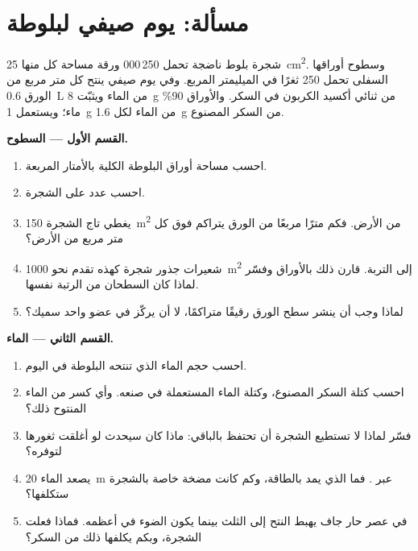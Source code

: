\section{مسألة: يوم صيفي لبلوطة}

\begin{problem}
\label{pb:g12:plant-rooted-life:1}
شجرة بلوط ناضجة تحمل 250\,000 ورقة مساحة كل منها \qty{25}{cm^2}.
وسطوح أوراقها السفلى تحمل 250 ثغرًا في الميليمتر المربع. وفي يوم صيفي
ينتح كل متر مربع من الورق \qty{0.6}{L} من الماء ويثبّت
\qty{8}{g} من ثنائي أكسيد الكربون في السكر. والأوراق 90\% ماء؛
ويستعمل  \qty{1}{g} من الماء لكل \qty{1.6}{g} من السكر
المصنوع.

\medskip
\noindent\textbf{القسم الأول --- السطوح.}
\begin{enumerate}
  \item احسب مساحة أوراق البلوطة الكلية بالأمتار المربعة.
  \item احسب عدد  على الشجرة.
  \item يغطي تاج الشجرة \qty{150}{m^2} من الأرض. فكم مترًا مربعًا من
        الورق يتراكم فوق كل متر مربع من الأرض؟
  \item شعيرات جذور شجرة كهذه تقدم نحو \qty{1000}{m^2} إلى التربة.
        قارن ذلك بالأوراق وفسّر لماذا كان السطحان من الرتبة نفسها.
  \item لماذا وجب أن ينشر سطح الورق رقيقًا متراكمًا، لا أن يركّز في
        عضو واحد سميك؟
\end{enumerate}

\medskip
\noindent\textbf{القسم الثاني --- الماء.}
\begin{enumerate}[resume]
  \item احسب حجم الماء الذي تنتحه البلوطة في اليوم.
  \item احسب كتلة السكر المصنوع، وكتلة الماء المستعملة في صنعه. وأي
        كسر من الماء المنتوح ذلك؟
  \item فسّر لماذا لا تستطيع الشجرة أن تحتفظ بالباقي: ماذا كان سيحدث
        لو أغلقت ثغورها لتوفره؟
  \item يصعد الماء \qty{20}{m} عبر . فما الذي يمد بالطاقة، وكم
        كانت مضخة خاصة بالشجرة ستكلفها؟
  \item في عصر حار جاف يهبط النتح إلى الثلث بينما يكون الضوء في أعظمه.
        فماذا فعلت الشجرة، وبكم يكلفها ذلك من السكر؟
\end{enumerate}


\end{problem}
